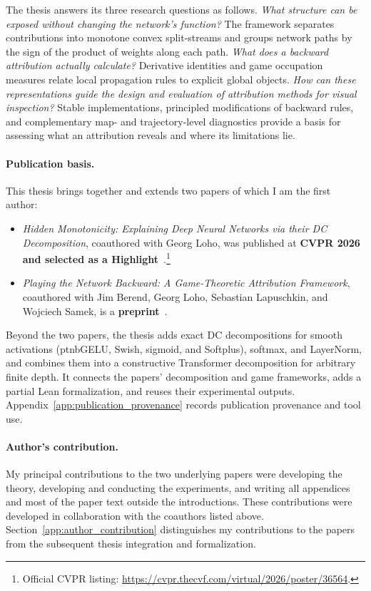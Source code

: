 The thesis answers its three research questions as follows. \emph{What structure can be exposed without changing the network's function?} The framework separates contributions into monotone convex split-streams and groups network paths by the sign of the product of weights along each path. \emph{What does a backward attribution actually calculate?} Derivative identities and game occupation measures relate local propagation rules to explicit global objects. \emph{How can these representations guide the design and evaluation of attribution methods for visual inspection?} Stable implementations, principled modifications of backward rules, and complementary map- and trajectory-level diagnostics provide a basis for assessing what an attribution reveals and where its limitations lie.

\paragraph{Publication basis.}
This thesis brings together and extends two papers of which I am the first author:
\begin{itemize}
\item \emph{Hidden Monotonicity: Explaining Deep Neural Networks via their DC Decomposition}, coauthored with Georg Loho, was published at \textbf{CVPR 2026 and selected as a Highlight}~\parencite{hiddenMono}.\footnote{Official CVPR listing: \url{https://cvpr.thecvf.com/virtual/2026/poster/36564}.}

\item \emph{Playing the Network Backward: A Game-Theoretic Attribution Framework}, coauthored with Jim Berend, Georg Loho, Sebastian Lapuschkin, and Wojciech Samek, is a \textbf{preprint}~\parencite{playingBackward2026}.
\end{itemize}
Beyond the two papers, the thesis adds exact DC decompositions for smooth activations (\ac{ptnbGELU}, Swish, sigmoid, and Softplus), softmax, and LayerNorm, and combines them into a constructive Transformer decomposition for arbitrary finite depth. It connects the papers' decomposition and game frameworks, adds a partial Lean formalization, and reuses their experimental outputs. Appendix~\ref{app:publication_provenance} records publication provenance and tool use.

\paragraph{Author's contribution.}
My principal contributions to the two underlying papers were developing the theory, developing and conducting the experiments, and writing all appendices and most of the paper text outside the introductions. These contributions were developed in collaboration with the coauthors listed above. Section~\ref{app:author_contribution} distinguishes my contributions to the papers from the subsequent thesis integration and formalization.

